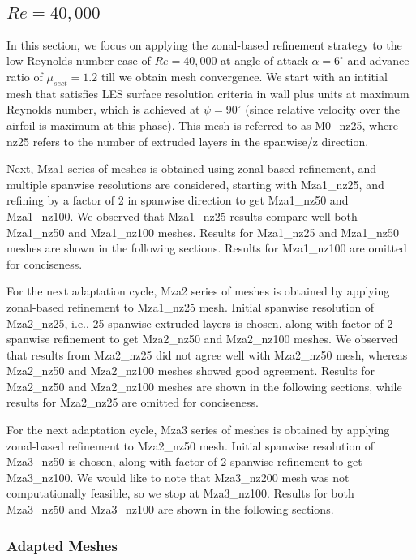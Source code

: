 \subsection{ $Re=40,000$}

In this section, we focus on applying the zonal-based refinement strategy to the low Reynolds number case of $Re=40,000$ at angle of attack $\alpha=6^\circ$ and advance ratio of $\mu_{sect}=1.2$ till we obtain mesh convergence.
We start with an intitial mesh that satisfies LES surface resolution criteria in wall plus units at maximum Reynolds number, which is achieved at $\psi=90^\circ$ (since relative velocity over the airfoil is maximum at this phase). 
This mesh is referred to as M0\_nz25, where nz25 refers to the number of extruded layers in the spanwise/z direction.

Next, Mza1 series of meshes is obtained using zonal-based refinement, and multiple spanwise resolutions are considered, starting with Mza1\_nz25, and refining by a factor of 2 in spanwise direction to get Mza1\_nz50 and Mza1\_nz100.
We observed that Mza1\_nz25 results compare well both Mza1\_nz50 and Mza1\_nz100 meshes.
Results for Mza1\_nz25 and Mza1\_nz50 meshes are shown in the following sections.
Results for Mza1\_nz100 are omitted for conciseness.

For the next adaptation cycle, Mza2 series of meshes is obtained by applying  zonal-based refinement to Mza1\_nz25 mesh.
Initial spanwise resolution of Mza2\_nz25, i.e., 25 spanwise extruded layers is chosen, along with factor of 2 spanwise refinement to get Mza2\_nz50 and Mza2\_nz100 meshes. 
We observed that results from Mza2\_nz25 did not agree well with Mza2\_nz50 mesh, whereas Mza2\_nz50 and Mza2\_nz100 meshes showed good agreement.
Results for Mza2\_nz50 and Mza2\_nz100 meshes are shown in the following sections, while results for Mza2\_nz25 are omitted for conciseness.

For the next adaptation cycle, Mza3 series of meshes is obtained by applying  zonal-based refinement to Mza2\_nz50 mesh. 
Initial spanwise resolution of Mza3\_nz50 is chosen, along with factor of 2 spanwise refinement to get Mza3\_nz100. 
We would like to note that Mza3\_nz200 mesh was not computationally feasible, so we stop at Mza3\_nz100.
Results for both Mza3\_nz50 and Mza3\_nz100 are shown in the following sections.

\pagebreak
\subsubsection{Adapted Meshes}

\label{sec:zonal_mesh_and_error}

